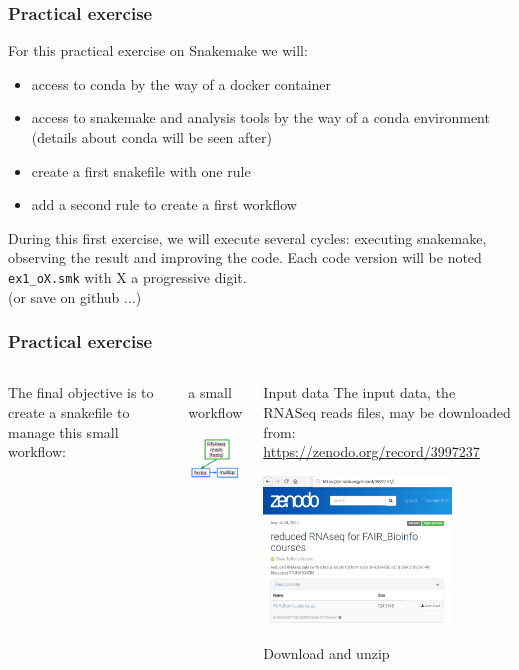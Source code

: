 \begin{frame}[containsverbatim]
\frametitle{Practical exercise}
\begin{exampleblock}{}
For this practical exercise on Snakemake we will:
\begin{itemize}
    \item access to conda by the way of a docker container
    \item access to snakemake and analysis tools by the way of a conda environment (details about conda will be seen after)
    \item create a first snakefile with one rule
    \item add a second rule to create a first workflow
\end{itemize}
\end{exampleblock}
During this first exercise, we will execute several cycles: executing snakemake, observing the result and improving the code. Each code version will be noted \verb|ex1_oX.smk| with X a progressive digit.\\
(or save on github ...)
\end{frame}
\begin{frame}
\frametitle{Practical exercise}
\begin{columns}
 The final objective is to create a snakefile to manage this small workflow:
   \begin{exampleblock}{a small workflow}
   \begin{center}
       \includegraphics[width=3.5cm]{03_workflow/images/FAIR_WF_2steps.png}
   \end{center}
   \end{exampleblock}

   \begin{exampleblock}{Input data}
    The input data, the RNASeq reads files, may be downloaded from: \url{https://zenodo.org/record/3997237}
    \begin{center}
        \includegraphics[width=5cm]{03_workflow/images/FAIR_data_zenodo.png}
    \end{center}
   Download and unzip
   \end{exampleblock}
\end{columns}
\end{frame}
